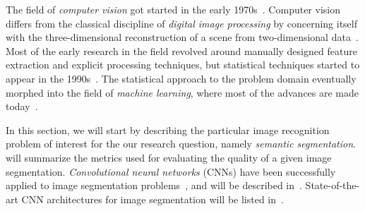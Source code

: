 The field of \textit{computer vision} got started in the early 1970s~\cite[p.~10]{computer_vision_history}.
Computer vision differs from the classical discipline of \textit{digital image processing} by concerning itself with the three-dimensional reconstruction of a scene from two-dimensional data~\cite[p.~10]{computer_vision_history}.
Most of the early research in the field revolved around manually designed feature extraction and explicit processing techniques, but statistical techniques started to appear in the 1990s~\cite[p.~15]{computer_vision_history}.
The statistical approach to the problem domain eventually morphed into the field of \textit{machine learning}, where most of the advances are made today~\cite[p.~17]{computer_vision_history}.

In this section, we will start by describing the particular image recognition problem of interest for the our research question, namely \textit{semantic segmentation}.
 will summarize the metrics used for evaluating the quality of a given image segmentation.
\textit{Convolutional neural networks} (CNNs) have been successfully applied to image segmentation problems~\cite[p.~1]{image_recognition}, and will be described in~.
State-of-the-art CNN architectures for image segmentation will be listed in~.
